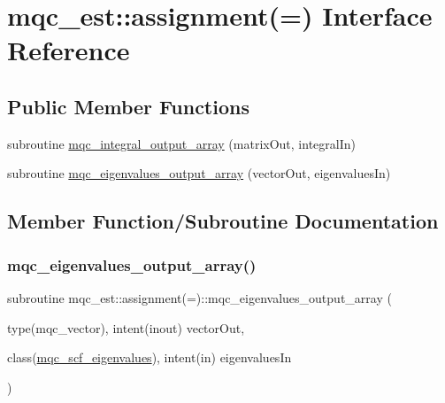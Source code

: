 \hypertarget{interfacemqc__est_1_1assignment_07_0A_08}{}\section{mqc\+\_\+est\+::assignment(=) Interface Reference}
\label{interfacemqc__est_1_1assignment_07_0A_08}
\subsection*{Public Member Functions}
\begin{DoxyCompactItemize}
\item 
subroutine \mbox{\hyperlink{interfacemqc__est_1_1assignment_07_0A_08_ac576f99113cbe722806bac575bdadc18}{mqc\+\_\+integral\+\_\+output\+\_\+array}} (matrix\+Out, integral\+In)
\item 
subroutine \mbox{\hyperlink{interfacemqc__est_1_1assignment_07_0A_08_aa2c0cf50cf2692923c2f3eb85750a3bd}{mqc\+\_\+eigenvalues\+\_\+output\+\_\+array}} (vector\+Out, eigenvalues\+In)
\end{DoxyCompactItemize}


\subsection{Member Function/\+Subroutine Documentation}
\mbox{\label{interfacemqc__est_1_1assignment_07_0A_08_aa2c0cf50cf2692923c2f3eb85750a3bd}} 
\subsubsection{\texorpdfstring{mqc\_eigenvalues\_output\_array()}{mqc\_eigenvalues\_output\_array()}}
{\footnotesize\ttfamily subroutine mqc\+\_\+est\+::assignment(=)\+::mqc\+\_\+eigenvalues\+\_\+output\+\_\+array (\begin{DoxyParamCaption}\item[{type(mqc\+\_\+vector), intent(inout)}]{vector\+Out,  }\item[{class(\mbox{\hyperlink{structmqc__est_1_1mqc__scf__eigenvalues}{mqc\+\_\+scf\+\_\+eigenvalues}}), intent(in)}]{eigenvalues\+In }\end{DoxyParamCaption})}


